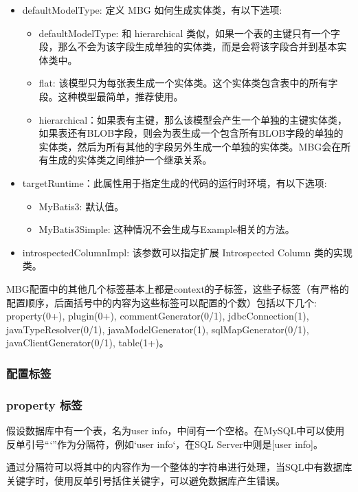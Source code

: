 \begin{itemize}
    \item defaultModelType: 定义 MBG 如何生成实体类，有以下选项:
    \begin{itemize}
        \item defaultModelType: 和 hierarchical 类似，如果一个表的主键只有一个字段，那么不会为该字段生成单独的实体类，而是会将该字段合并到基本实体类中。
        \item flat: 该模型只为每张表生成一个实体类。这个实体类包含表中的所有字段。这种模型最简单，推荐使用。
        \item hierarchical：如果表有主键，那么该模型会产生一个单独的主键实体类，如果表还有BLOB字段，则会为表生成一个包含所有BLOB字段的单独的实体类，然后为所有其他的字段另外生成一个单独的实体类。MBG会在所有生成的实体类之间维护一个继承关系。
    \end{itemize}
    \item  targetRuntime：此属性用于指定生成的代码的运行时环境，有以下选项:
    \begin{itemize}
        \item MyBatis3: 默认值。
        \item MyBatis3Simple: 这种情况不会生成与Example相关的方法。
    \end{itemize}
    \item introspectedColumnImpl: 该参数可以指定扩展 Introspected Column 类的实现类。
\end{itemize}

MBG配置中的其他几个标签基本上都是context的子标签，这些子标签（有严格的配置顺序，后面括号中的内容为这些标签可以配置的个数）包括以下几个: property(0+), plugin(0+), commentGenerator(0/1), jdbcConnection(1), javaTypeResolver(0/1), javaModelGenerator(1), sqlMapGenerator(0/1), javaClientGenerator(0/1), table(1+)。

\subsubsection{配置标签}

\subsubsection*{property 标签}

假设数据库中有一个表，名为user info，中间有一个空格。在MySQL中可以使用反单引号“`”作为分隔符，例如`user info`，在SQL Server中则是[user info]。

通过分隔符可以将其中的内容作为一个整体的字符串进行处理，当SQL中有数据库关键字时，使用反单引号括住关键字，可以避免数据库产生错误。

